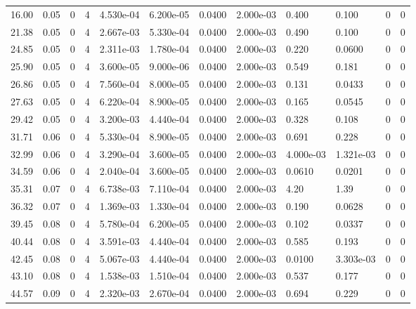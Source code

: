 \documentclass[preview]{standalone}
\begin{document}
{{\begin{tabular}{L{1.2cm}C{1.2cm} C{0.3cm}C{0.5cm} C{1.4cm}C{1.4cm} C{1.4cm}C{1.4cm} C{1.6cm}C{1.6cm} C{1.6cm}C{1.6cm}}
  16.00  &  0.05  & 0     &  4 &  4.530e-04  & 6.200e-05  &  0.0400&   2.000e-03& 0.400 & 0.100   &  0 & 0  \\ 
  21.38  &  0.05  & 0     &  4 &  2.667e-03  & 5.330e-04  &  0.0400&   2.000e-03& 0.490 & 0.100   &  0 & 0  \\ 
  24.85  &  0.05  & 0     &  4 &  2.311e-03  & 1.780e-04  &  0.0400&   2.000e-03& 0.220 & 0.0600   &  0 & 0  \\ 
  25.90  &  0.05  & 0     &  4 &  3.600e-05  & 9.000e-06  &  0.0400&   2.000e-03& 0.549 & 0.181   &  0 & 0  \\ 
  26.86  &  0.05  & 0     &  4 &  7.560e-04  & 8.000e-05  &  0.0400&   2.000e-03& 0.131 & 0.0433   &  0 & 0  \\ 
  27.63  &  0.05  & 0     &  4 &  6.220e-04  & 8.900e-05  &  0.0400&   2.000e-03& 0.165 & 0.0545   &  0 & 0  \\ 
  29.42  &  0.05  & 0     &  4 &  3.200e-03  & 4.440e-04  &  0.0400&   2.000e-03& 0.328 & 0.108   &  0 & 0  \\ 
  31.71  &  0.06  & 0     &  4 &  5.330e-04  & 8.900e-05  &  0.0400&   2.000e-03& 0.691 & 0.228   &  0 & 0  \\ 
  32.99  &  0.06  & 0     &  4 &  3.290e-04  & 3.600e-05  &  0.0400&   2.000e-03& 4.000e-03 & 1.321e-03   &  0 & 0  \\ 
  34.59  &  0.06  & 0     &  4 &  2.040e-04  & 3.600e-05  &  0.0400&   2.000e-03& 0.0610 & 0.0201   &  0 & 0  \\ 
  35.31  &  0.07  & 0     &  4 &  6.738e-03  & 7.110e-04  &  0.0400&   2.000e-03& 4.20 & 1.39   &  0 & 0  \\ 
  36.32  &  0.07  & 0     &  4 &  1.369e-03  & 1.330e-04  &  0.0400&   2.000e-03& 0.190 & 0.0628   &  0 & 0  \\ 
  39.45  &  0.08  & 0     &  4 &  5.780e-04  & 6.200e-05  &  0.0400&   2.000e-03& 0.102 & 0.0337   &  0 & 0  \\ 
  40.44  &  0.08  & 0     &  4 &  3.591e-03  & 4.440e-04  &  0.0400&   2.000e-03& 0.585 & 0.193   &  0 & 0  \\ 
  42.45  &  0.08  & 0     &  4 &  5.067e-03  & 4.440e-04  &  0.0400&   2.000e-03& 0.0100 & 3.303e-03   &  0 & 0  \\ 
  43.10  &  0.08  & 0     &  4 &  1.538e-03  & 1.510e-04  &  0.0400&   2.000e-03& 0.537 & 0.177   &  0 & 0  \\ 
  44.57  &  0.09  & 0     &  4 &  2.320e-03  & 2.670e-04  &  0.0400&   2.000e-03& 0.694 & 0.229   &  0 & 0  \\ 

\end{tabular}}}
\end{document}
